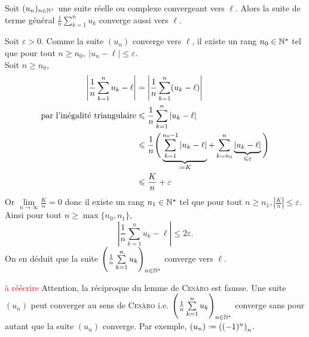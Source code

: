 \begin{lemme}
    Soit $(u_n)_{n \in \mathbb{N}^\star}$ une suite réelle ou complexe convergeant vers $\ell$.
    Alors la suite de terme général $\frac{1}{n} \sum\limits_{k=1}^{n} u_k$ converge aussi vers $\ell$.
\end{lemme}

\begin{preuve}
    Soit $\varepsilon > 0$. Comme la suite $(u_n)$ converge vers $\ell$, il existe un rang $n_0 \in \mathbb{N}^\star$ tel que pour tout $n \geqslant n_0,\ |u_n - \ell| \leqslant \varepsilon$. \\
    Soit $n \geqslant n_0$,
    \begin{align*}
        \left| \frac{1}{n} \sum_{k=1}^n u_k - \ell \right| &= \left| \frac{1}{n} \sum_{k=1}^n (u_k - \ell) \right| \\
        \text{par l'inégalité triangulaire} &\leqslant \frac{1}{n} \sum_{k=1}^n |u_k - \ell| \\
        &\leqslant \frac{1}{n} \Bigg( \underbrace{\sum_{k=1}^{n_0-1} |u_k - \ell|}_{\defeq K} + \sum_{k=n_0}^n \underbrace{|u_k - \ell|}_{\leqslant \varepsilon} \Bigg) \\
        &\leqslant \frac{K}{n} + \varepsilon
    \end{align*}
    Or $\lim\limits_{n \to \infty} \frac{K}{n} = 0$ donc il existe un rang $n_1 \in \mathbb{N}^\star$ tel que pour tout $n \geqslant n_1, \left| \frac{K}{n} \right| \leqslant \varepsilon$. \\
    Ainsi pour tout $n \geqslant \max \{ n_0, n_1 \}$, 
    $$\left| \frac{1}{n} \sum_{k=1}^n u_k - \ell \right| \leqslant 2 \varepsilon.$$
    On en déduit que la suite $\Bigg( \frac{1}{n} \sum\limits_{k=1}^{n} u_k \Bigg)_{n \in \mathbb{N}^\star}$ converge vers $\ell$.
\end{preuve}

\begin{remarque}
    \textcolor{red}{à réécrire}
    Attention, la réciproque du lemme de \textsc{Cesàro} est fausse. Une suite $(u_n)$ peut converger au sens de \textsc{Cesàro} i.e. $\Bigg( \frac{1}{n} \sum\limits_{k=1}^{n} u_k \Bigg)_{n \in \mathbb{N}^\star}$ converge sans pour autant que la suite $(u_n)$ converge. Par exemple, $(u_n) \defeq \left((-1)^n\right)_n$.
\end{remarque}